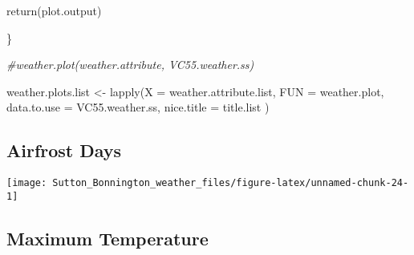 \documentclass{article}
\newenvironment{Shaded}{\begin{snugshade}}{\end{snugshade}}
\newcommand{\AttributeTok}[1]{\textcolor[rgb]{0.77,0.63,0.00}{#1}}
\newcommand{\CommentTok}[1]{\textcolor[rgb]{0.56,0.35,0.01}{\textit{#1}}}
\newcommand{\FunctionTok}[1]{\textcolor[rgb]{0.00,0.00,0.00}{#1}}
\newcommand{\NormalTok}[1]{#1}
\newcommand{\OtherTok}[1]{\textcolor[rgb]{0.56,0.35,0.01}{#1}}
\newcommand{\SpecialCharTok}[1]{\textcolor[rgb]{0.00,0.00,0.00}{#1}}
\newcommand{\StringTok}[1]{\textcolor[rgb]{0.31,0.60,0.02}{#1}}
\begin{document}
\begin{Shaded}
\begin{Highlighting}[]
\FunctionTok{return}\NormalTok{(plot.output)}

\NormalTok{\}}

\CommentTok{\#weather.plot(weather.attribute, VC55.weather.ss)}

\NormalTok{weather.plots.list }\OtherTok{\textless{}{-}} \FunctionTok{lapply}\NormalTok{(}\AttributeTok{X =}\NormalTok{ weather.attribute.list, }
                             \AttributeTok{FUN =}\NormalTok{ weather.plot, }
                             \AttributeTok{data.to.use =}\NormalTok{ VC55.weather.ss,}
                             \AttributeTok{nice.title =}\NormalTok{ title.list )}
\end{Highlighting}
\end{Shaded}

\hypertarget{airfrost-days}{%
\subsection{Airfrost Days}\label{airfrost-days}}

\begin{Shaded}
\end{Shaded}

\begin{center}\texttt{[image: Sutton\_Bonnington\_weather\_files/figure-latex/unnamed-chunk-24-1]} \end{center}

\hypertarget{maximum-temperature}{%
\subsection{Maximum Temperature}\label{maximum-temperature}}
\end{document}
